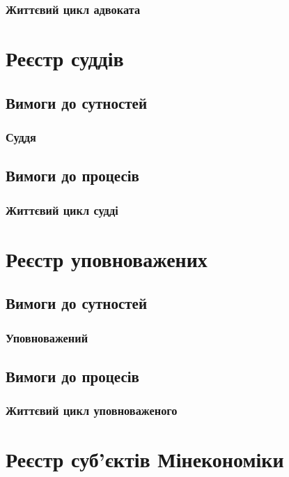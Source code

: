 \documentclass{article}
\begin{document}
\subsubsection{Життєвий цикл адвоката}

\newpage
\section{Реєстр суддів}

\subsection{Вимоги до сутностей}

\subsubsection{Суддя}

\subsection{Вимоги до процесів}

\subsubsection{Життєвий цикл судді}

\newpage
\section{Реєстр уповноважених}

\subsection{Вимоги до сутностей}

\subsubsection{Уповноважений}

\subsection{Вимоги до процесів}

\subsubsection{Життєвий цикл уповноваженого}

\newpage
\section{Реєстр суб'єктів Мінекономіки}
\end{document}
